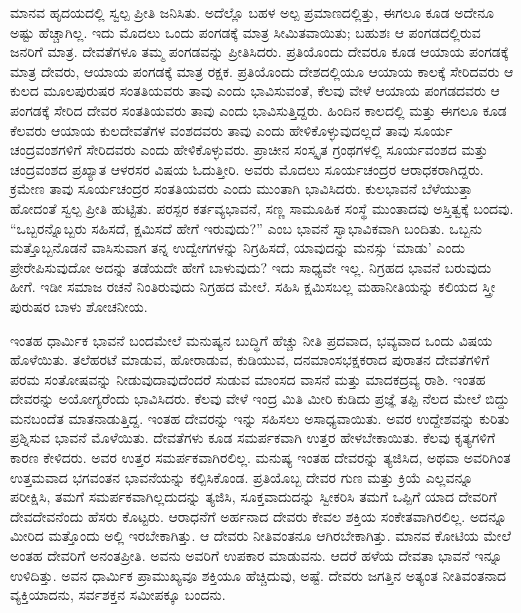 ಮಾನವ ಹೃದಯದಲ್ಲಿ ಸ್ವಲ್ಪ ಪ್ರೀತಿ ಜನಿಸಿತು. ಅದೆಲ್ಲೊ ಬಹಳ ಅಲ್ಪ ಪ್ರಮಾಣದಲ್ಲಿತ್ತು, ಈಗಲೂ ಕೂಡ ಅದೇನೂ ಅಷ್ಟು ಹೆಚ್ಚಾಗಿಲ್ಲ. ಇದು ಮೊದಲು ಒಂದು ಪಂಗಡಕ್ಕೆ ಮಾತ್ರ ಸೀಮಿತವಾಯಿತು; ಬಹುಶಃ ಆ ಪಂಗಡದಲ್ಲಿರುವ ಜನರಿಗೆ ಮಾತ್ರ. ದೇವತೆಗಳೂ ತಮ್ಮ ಪಂಗಡವನ್ನು ಪ್ರೀತಿಸಿದರು. ಪ್ರತಿಯೊಂದು ದೇವರೂ ಕೂಡ ಆಯಾಯ ಪಂಗಡಕ್ಕೆ ಮಾತ್ರ ದೇವರು, ಆಯಾಯ ಪಂಗಡಕ್ಕೆ ಮಾತ್ರ ರಕ್ಷಕ. ಪ್ರತಿಯೊಂದು ದೇಶದಲ್ಲಿಯೂ ಆಯಾಯ ಕಾಲಕ್ಕೆ ಸೇರಿದವರು ಆ ಕುಲದ ಮೂಲಪುರುಷರ ಸಂತತಿಯವರು ತಾವು ಎಂದು ಭಾವಿಸುವಂತೆ, ಕೆಲವು ವೇಳೆ ಆಯಾಯ ಪಂಗಡದವರು ಆ ಪಂಗಡಕ್ಕೆ ಸೇರಿದ ದೇವರ ಸಂತತಿಯವರು ತಾವು ಎಂದು ಭಾವಿಸುತ್ತಿದ್ದರು. ಹಿಂದಿನ ಕಾಲದಲ್ಲಿ ಮತ್ತು ಈಗಲೂ ಕೂಡ ಕೆಲವರು ಆಯಾಯ ಕುಲದೇವತೆಗಳ ವಂಶದವರು ತಾವು ಎಂದು ಹೇಳಿಕೊಳ್ಳುವುದಲ್ಲದೆ ತಾವು ಸೂರ್ಯ ಚಂದ್ರವಂಶಗಳಿಗೆ ಸೇರಿದವರು ಎಂದು ಹೇಳಿಕೊಳ್ಳುವರು. ಪ್ರಾಚೀನ ಸಂಸ್ಕೃತ ಗ್ರಂಥಗಳಲ್ಲಿ ಸೂರ್ಯವಂಶದ ಮತ್ತು ಚಂದ್ರವಂಶದ ಪ್ರಖ್ಯಾತ ಆಳರಸರ ವಿಷಯ ಓದುತ್ತೀರಿ. ಅವರು ಮೊದಲು ಸೂರ್ಯಚಂದ್ರರ ಆರಾಧಕರಾಗಿದ್ದರು. ಕ್ರಮೇಣ ತಾವು ಸೂರ್ಯಚಂದ್ರರ ಸಂತತಿಯವರು ಎಂದು ಮುಂತಾಗಿ ಭಾವಿಸಿದರು. ಕುಲಭಾವನೆ ಬೆಳೆಯುತ್ತಾ ಹೋದಂತೆ ಸ್ವಲ್ಪ ಪ್ರೀತಿ ಹುಟ್ಟಿತು. ಪರಸ್ಪರ ಕರ್ತವ್ಯಭಾವನೆ, ಸಣ್ಣ ಸಾಮೂಹಿಕ ಸಂಸ್ಥೆ ಮುಂತಾದವು ಅಸ್ತಿತ್ವಕ್ಕೆ ಬಂದವು. “ಒಬ್ಬರನ್ನೊಬ್ಬರು ಸಹಿಸದೆ, ಕ್ಷಮಿಸದೆ ಹೇಗೆ ಇರುವುದು?” ಎಂಬ ಭಾವನೆ ಸ್ವಾಭಾವಿಕವಾಗಿ ಬಂದಿತು. ಒಬ್ಬನು ಮತ್ತೊಬ್ಬನೊಡನೆ ವಾಸಿಸುವಾಗ ತನ್ನ ಉದ್ವೇಗಗಳನ್ನು ನಿಗ್ರಹಿಸದೆ, ಯಾವುದನ್ನು ಮನಸ್ಸು ‘ಮಾಡು’ ಎಂದು ಪ್ರೇರೇಪಿಸುವುದೋ ಅದನ್ನು ತಡೆಯದೇ ಹೇಗೆ ಬಾಳುವುದು? ಇದು ಸಾಧ್ಯವೇ ಇಲ್ಲ. ನಿಗ್ರಹದ ಭಾವನೆ ಬರುವುದು ಹೀಗೆ. ಇಡೀ ಸಮಾಜ ರಚನೆ ನಿಂತಿರುವುದು ನಿಗ್ರಹದ ಮೇಲೆ. ಸಹಿಸಿ ಕ್ಷಮಿಸಬಲ್ಲ ಮಹಾನೀತಿಯನ್ನು ಕಲಿಯದ ಸ್ತ್ರೀ ಪುರುಷರ ಬಾಳು ಶೋಚನೀಯ.

ಇಂತಹ ಧಾರ್ಮಿಕ ಭಾವನೆ ಬಂದಮೇಲೆ ಮನುಷ್ಯನ ಬುದ್ಧಿಗೆ ಹೆಚ್ಚು ನೀತಿ ಪ್ರದವಾದ, ಭವ್ಯವಾದ ಒಂದು ವಿಷಯ ಹೊಳೆಯಿತು. ತಲೆಹರಟೆ ಮಾಡುವ, ಹೋರಾಡುವ, ಕುಡಿಯುವ, ದನಮಾಂಸಭಕ್ಷಕರಾದ ಪುರಾತನ ದೇವತೆಗಳಿಗೆ ಪರಮ ಸಂತೋಷವನ್ನು ನೀಡುವುದಾವುದೆಂದರೆ ಸುಡುವ ಮಾಂಸದ ವಾಸನೆ ಮತ್ತು ಮಾದಕದ್ರವ್ಯ ರಾಶಿ. ಇಂತಹ ದೇವರನ್ನು ಅಯೋಗ್ಯರೆಂದು ಭಾವಿಸಿದರು. ಕೆಲವು ವೇಳೆ ಇಂದ್ರ ಮಿತಿ ಮೀರಿ ಕುಡಿದು ಪ್ರಜ್ಞೆ ತಪ್ಪಿ ನೆಲದ ಮೇಲೆ ಬಿದ್ದು ಮನಬಂದೆತ ಮಾತನಾಡುತ್ತಿದ್ದ. ಇಂತಹ ದೇವರನ್ನು ಇನ್ನು ಸಹಿಸಲು ಅಸಾಧ್ಯವಾಯಿತು. ಅವರ ಉದ್ದೇಶವನ್ನು ಕುರಿತು ಪ್ರಶ್ನಿಸುವ ಭಾವನೆ ಮೊಳೆಯಿತು. ದೇವತೆಗಳು ಕೂಡ ಸಮರ್ಪಕವಾಗಿ ಉತ್ತರ ಹೇಳಬೇಕಾಯಿತು. ಕೆಲವು ಕೃತ್ಯಗಳಿಗೆ ಕಾರಣ ಕೇಳಿದರು. ಅವರ ಉತ್ತರ ಸಮರ್ಪಕವಾಗಿರಲಿಲ್ಲ. ಮನುಷ್ಯ ಇಂತಹ ದೇವರನ್ನು ತ್ಯಜಿಸಿದ, ಅಥವಾ ಅವರಿಗಿಂತ ಉತ್ತಮವಾದ ಭಗವಂತನ ಭಾವನೆಯನ್ನು ಕಲ್ಪಿಸಿಕೊಂಡ. ಪ್ರತಿಯೊಬ್ಬ ದೇವರ ಗುಣ ಮತ್ತು ಕ್ರಿಯೆ ಎಲ್ಲವನ್ನೂ ಪರೀಕ್ಷಿಸಿ, ತಮಗೆ ಸಮರ್ಪಕವಾಗಿಲ್ಲದುದನ್ನು ತ್ಯಜಿಸಿ, ಸೂಕ್ತವಾದುದನ್ನು ಸ್ವೀಕರಿಸಿ ತಮಗೆ ಒಪ್ಪಿಗೆ ಯಾದ ದೇವರಿಗೆ ದೇವದೇವನೆಂದು ಹೆಸರು ಕೊಟ್ಟರು. ಆರಾಧನೆಗೆ ಅರ್ಹನಾದ ದೇವರು ಕೇವಲ ಶಕ್ತಿಯ ಸಂಕೇತವಾಗಿರಲಿಲ್ಲ. ಅದನ್ನೂ ಮೀರಿದ ಮತ್ತೊಂದು ಅಲ್ಲಿ ಇರಬೇಕಾಗಿತ್ತು. ಆ ದೇವರು ನೀತಿವಂತನೂ ಆಗಿರಬೇಕಾಗಿತ್ತು. ಮಾನವ ಕೋಟಿಯ ಮೇಲೆ ಅಂತಹ ದೇವರಿಗೆ ಅನಂತಪ್ರೀತಿ. ಅವನು ಅವರಿಗೆ ಉಪಕಾರ ಮಾಡುವನು. ಆದರೆ ಹಳೆಯ ದೇವತಾ ಭಾವನೆ ಇನ್ನೂ ಉಳಿದಿತ್ತು. ಅವನ ಧಾರ್ಮಿಕ ಪ್ರಾಮುಖ್ಯವೂ ಶಕ್ತಿಯೂ ಹೆಚ್ಚಿದುವು, ಅಷ್ಟೆ. ದೇವರು ಜಗತ್ತಿನ ಅತ್ಯಂತ ನೀತಿವಂತನಾದ ವ್ಯಕ್ತಿಯಾದನು, ಸರ್ವಶಕ್ತನ ಸಮೀಪಕ್ಕೂ ಬಂದನು.

